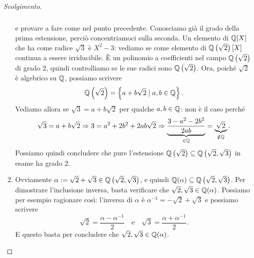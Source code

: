 \begin{proof}[Svolgimento]
\begin{enumerate}
\[\begin{tikzcd}
\end{tikzcd} \]
e provare a fare come nel punto precedente. Conosciamo già il grado della prima estensione, perciò concentriamoci sulla seconda. Un elemento di \(\mathbb{Q}[X]\) che ha come radice \(\sqrt3\) è \(X^2-3\): vediamo se come elemento di \(\mathbb{Q}\left(\sqrt2\right)[X]\) continua a essere irriducibile. È un polinomio a coefficienti nel campo \(\mathbb{Q}\left(\sqrt2\right)\) di grado \(2\), quindi controlliamo se le sue radici sono \(\mathbb{Q}\left(\sqrt2\right)\). Ora, poiché \(\sqrt2\) è algebrico su \(\mathbb{Q}\), possiamo scrivere
\[\mathbb{Q}\left(\sqrt2\right) = \left\{a+b\sqrt2 \mid a, b \in \mathbb{Q}\right\} .\]
Vediamo allora se \(\sqrt3 = a+b\sqrt2\) per qualche \(a, b \in \mathbb{Q}\): non è il caso perché
\[\sqrt3 = a+b\sqrt2 \Rightarrow 3 = a^2+2b^2+2ab\sqrt2 \Rightarrow \underbrace{\frac{3-a^2-2b^2}{2ab}}_{\in \Q} = \underbrace{\sqrt2}_{\notin \Q} .\]
Possiamo quindi concludere che pure l'estensione \(\mathbb{Q}\left(\sqrt 2\right) \subseteq \mathbb{Q}\left(\sqrt 2, \sqrt 3\right)\) in esame ha grado \(2\).
\item Ovviamente \(\alpha := \sqrt2+\sqrt3 \in \mathbb{Q}\left(\sqrt2,\sqrt3\right)\), e quindi \(\mathbb{Q}(\alpha)\subseteq\mathbb{Q}\left(\sqrt2,\sqrt3\right)\). Per dimostrare l'inclusione inversa, basta verificare che \(\sqrt2,\sqrt3 \in \mathbb{Q}(\alpha)\). Possiamo per esempio ragionare così: l'inversa di \(\alpha\) è \(\alpha^{-1} = -\sqrt2 + \sqrt3\) e possiamo scrivere
\[\sqrt2 = \frac{\alpha - \alpha^{-1}}{2} \quad\text{e}\quad \sqrt3 = \frac{\alpha+\alpha^{-1}}{2} .\]
E questo basta per concludere che \(\sqrt 2, \sqrt3 \in \mathbb{Q}(\alpha)\).

\end{enumerate}
\end{proof}
